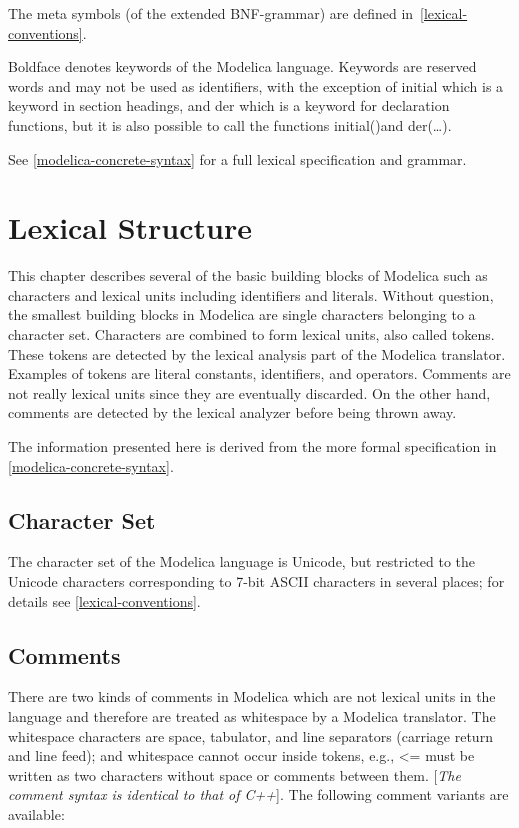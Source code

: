 \documentclass[10pt,a4paper]{report}
\def\doublelabel#1{\label{#1}\hypertarget{#1}{}}
\begin{document}
The meta symbols (of the extended BNF-grammar) are defined in~\ref{lexical-conventions}.

Boldface denotes keywords of the Modelica language. Keywords are
reserved words and may not be used as identifiers, with the exception of
initial which is a keyword in section headings, and der which is a
keyword for declaration functions, but it is also possible to call the
functions initial()and der(\ldots{}).

See \ref{modelica-concrete-syntax} for a full lexical specification and grammar.

\chapter{Lexical Structure}\doublelabel{lexical-structure}

This chapter describes several of the basic building blocks of Modelica
such as characters and lexical units including identifiers and literals.
Without question, the smallest building blocks in Modelica are single
characters belonging to a character set. Characters are combined to form
lexical units, also called tokens. These tokens are detected by the
lexical analysis part of the Modelica translator. Examples of tokens are
literal constants, identifiers, and operators. Comments are not really
lexical units since they are eventually discarded. On the other hand,
comments are detected by the lexical analyzer before being thrown away.

The information presented here is derived from the more formal
specification in \ref{modelica-concrete-syntax}.

\section{Character Set}\doublelabel{character-set}

The character set of the Modelica language is Unicode, but restricted to
the Unicode characters corresponding to 7-bit ASCII characters in
several places; for details see \ref{lexical-conventions}.

\section{Comments}\doublelabel{comments}

There are two kinds of comments in Modelica which are not lexical units
in the language and therefore are treated as whitespace by a Modelica
translator. The whitespace characters are space, tabulator, and line
separators (carriage return and line feed); and whitespace cannot occur
inside tokens, e.g., \textless{}= must be written as two characters
without space or comments between them. {[}\emph{The comment syntax is
identical to that of C++}{]}. The following comment variants are
available:
\end{document}
